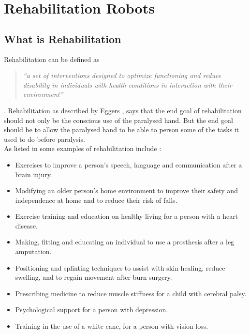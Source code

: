 \section{Rehabilitation Robots}\label{sec:rehabrobots}
\subsection{What is Rehabilitation}
Rehabilitation can be defined as \begin{quotation}
	\textit{``a set of interventions designed to optimize functioning and reduce disability in individuals with health conditions in interaction with their environment''}\\
	\begin{flushright}
		\cite{Sjolund2013}
	\end{flushright}
\end{quotation}.
Rehabilitation as described by Eggers \cite{eggers1984occupational}, says that the end goal of rehabilitation should not only be the conscious use of the paralysed hand. But the end goal should be to allow the paralysed hand to be able to person some of the tasks it used to do before paralysis\cite{Johnson2005}.\\
As listed in \cite{whorehab} some examples of rehabilitation include : 
\begin{itemize}%
	\item Exercises to improve a person’s speech, language and communication after a brain injury.
	\item Modifying an older person’s home environment to improve their safety and independence at home and to reduce their risk of falls.
	\item Exercise training and education on healthy living for a person with a heart disease.
	\item Making, fitting and educating an individual to use a prosthesis after a leg amputation.
	\item Positioning and splinting techniques to assist with skin healing, reduce swelling, and to regain movement after burn surgery.
	\item Prescribing medicine to reduce muscle stiffness for a child with cerebral palsy.
	\item Psychological support for a person with depression.
	\item Training in the use of a white cane, for a person with vision loss.
\end{itemize}

